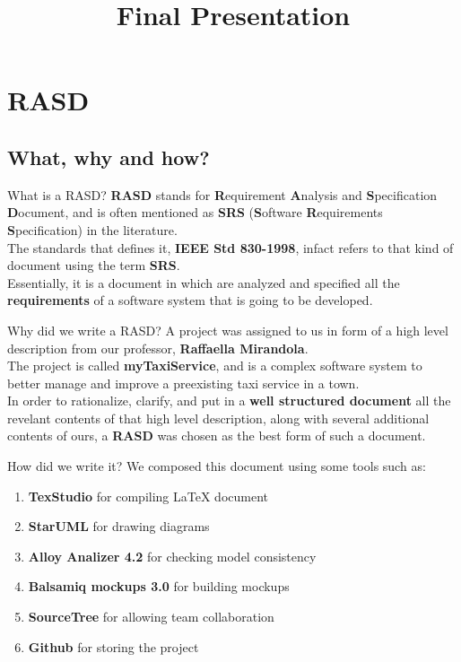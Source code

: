 \documentclass{../common/latex_classes/pdf_presentation}
\title{Final Presentation}
\begin{document}
	\titleToc{}
	\section{RASD}
	\subsection{What, why and how?}
	\begin{frame}{What is a RASD?}
		\textbf{RASD} stands for \textbf{R}equirement \textbf{A}nalysis and \textbf{S}pecification \textbf{D}ocument, and is often mentioned as \textbf{SRS} (\textbf{S}oftware \textbf{R}equirements \textbf{S}pecification) in the literature.\\
		The standards that defines it, \textbf{IEEE Std 830-1998}, infact refers to that kind of document using the term \textbf{SRS}.\\
		Essentially, it is a document in which are analyzed and specified all the \textbf{requirements} of a software system that is going to be developed.
	\end{frame}
	\begin{frame}{Why did we write a RASD?}
		A project was assigned to us in form of a high level description from our professor, \textbf{Raffaella Mirandola}.\\
		The project is called \textbf{myTaxiService}, and is a complex software system to better manage and improve a preexisting taxi service in a town.\\
		In order to rationalize, clarify, and put in a \textbf{well structured document} all the revelant contents of that high level description, along with several additional contents of ours, a \textbf{RASD} was chosen as the best form of such a document.\\
	\end{frame}
	\begin{frame}{How did we write it?}
		We composed this document using some tools such as:
		\begin{enumerate}
			\item\textbf{TexStudio} for compiling \LaTeX{} document
			\item\textbf{StarUML} for drawing diagrams
			\item\textbf{Alloy Analizer 4.2} for checking model consistency
			\item\textbf{Balsamiq mockups 3.0} for building mockups
			\item\textbf{SourceTree} for allowing team collaboration
			\item\textbf{Github} for storing the project 
		\end{enumerate}		
	\end{frame}
\end{document}
